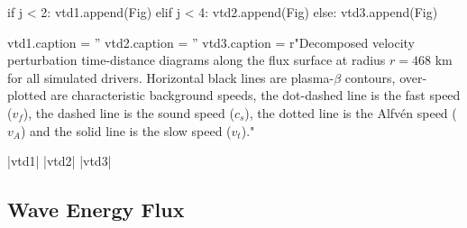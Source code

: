 \begin{pycode}[chapter4]
    
    if j < 2:
        vtd1.append(Fig)
    elif j < 4:
        vtd2.append(Fig)
    else:
        vtd3.append(Fig)

vtd1.caption = ''
vtd2.caption = ''
vtd3.caption = r"Decomposed velocity perturbation time-distance diagrams along the flux surface at radius $r = 468$ km for all simulated drivers. Horizontal black lines are plasma-$\beta$ contours, over-plotted are characteristic background speeds, the dot-dashed line is the fast speed ($v_f$), the dashed line is the sound speed ($c_s$), the dotted line is the Alfv\'en speed ($v_A$) and the solid line is the slow speed ($v_t$)."

\end{pycode}


\py[chapter4]|vtd1|
\py[chapter4]|vtd2|
\py[chapter4]|vtd3|


\subsection{Wave Energy Flux}\label{sec:energy_flux}

